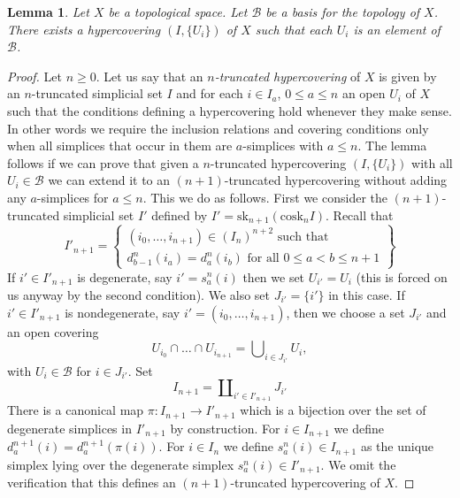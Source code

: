 \documentclass{stacks-project}
\theoremstyle{plain}
\newtheorem{lemma}[subsection]{Lemma}
\theoremstyle{definition}
\theoremstyle{remark}
\numberwithin{equation}{subsection}
\begin{document}
\begin{lemma}
\label{lemma-basis-hypercovering}
Let $X$ be a topological space.
Let $\mathcal{B}$ be a basis for the topology of $X$.
There exists a hypercovering $(I, \{U_i\})$ of $X$
such that each $U_i$ is an element of $\mathcal{B}$.
\end{lemma}

\begin{proof}
Let $n \geq 0$.
Let us say that an {\it $n$-truncated hypercovering} of $X$ is
given by an $n$-truncated simplicial set $I$ and for each
$i \in I_a$, $0 \leq a \leq n$ an open $U_i$ of $X$ such that
the conditions defining a hypercovering hold whenever they make sense.
In other words we require the inclusion relations and covering
conditions only when all simplices that occur in them
are $a$-simplices with $a \leq n$. The lemma follows if we can prove
that given a $n$-truncated hypercovering $(I, \{U_i\})$ with
all $U_i \in \mathcal{B}$ we can extend it to an $(n + 1)$-truncated
hypercovering without adding any $a$-simplices for $a \leq n$.
This we do as follows. First we consider the $(n + 1)$-truncated
simplicial set $I'$ defined by
$I' = \text{sk}_{n + 1}(\text{cosk}_n I)$.
Recall that
$$
I'_{n + 1} =
\left\{
\begin{matrix}
(i_0, \ldots, i_{n + 1}) \in (I_n)^{n + 2} \text{ such that}\\
d^n_{b - 1}(i_a) = d^n_a(i_b) \text{ for all }0\leq a < b\leq n + 1
\end{matrix}
\right\}
$$
If $i' \in I'_{n + 1}$ is degenerate, say $i' = s^n_a(i)$ then we set
$U_{i'} = U_i$ (this is forced on us anyway by the second condition).
We also set $J_{i'} = \{i'\}$ in this case.
If $i' \in I'_{n + 1}$ is nondegenerate, say
$i' = (i_0, \ldots, i_{n + 1})$, then we choose a set
$J_{i'}$ and an open covering
\begin{equation}
\label{equation-choose-covering}
U_{i_0} \cap \ldots \cap U_{i_{n + 1}} =
\bigcup\nolimits_{i \in J_{i'}} U_i,
\end{equation}
with $U_i \in \mathcal{B}$ for $i \in J_{i'}$.
Set
$$
I_{n + 1} = \coprod\nolimits_{i' \in I'_{n + 1}} J_{i'}
$$
There is a canonical map $\pi : I_{n + 1} \to I'_{n + 1}$ which is
a bijection over the set of degenerate simplices in $I'_{n + 1}$ by
construction.
For $i \in I_{n + 1}$ we define $d^{n + 1}_a(i) = d^{n + 1}_a(\pi(i))$.
For $i \in I_n$ we define $s^n_a(i) \in I_{n + 1}$ as the unique
simplex lying over the degenerate simplex $s^n_a(i) \in I'_{n + 1}$.
We omit the verification that this defines an $(n + 1)$-truncated
hypercovering of $X$.
\end{proof}
\end{document}
